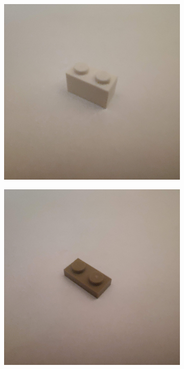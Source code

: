 \documentclass[]{article}
\begin{document}
\begin{figure}[h]
\begin{subfigure}[b]{0.2\textwidth}
    \end{subfigure}
    \begin{subfigure}[b]{0.2\textwidth}
        \includegraphics[width=\textwidth]{photographed images/9.jpg}
    \end{subfigure}
    \begin{subfigure}[b]{0.2\textwidth}
        \includegraphics[width=\textwidth]{photographed images/10.jpg}

\end{subfigure}
\end{figure}
\end{document}
